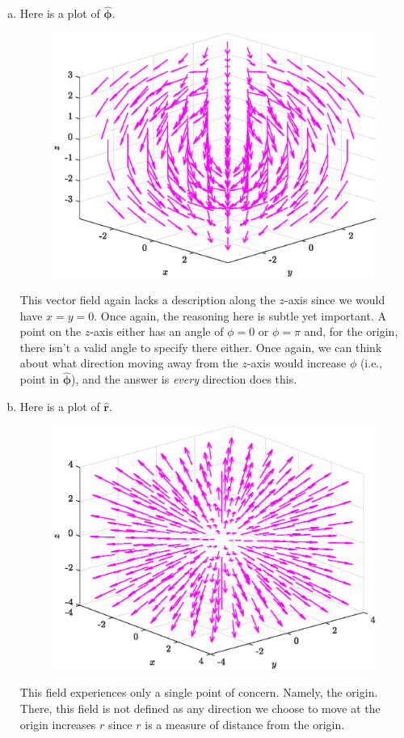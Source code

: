 \documentclass[12pt]{article} %
\newcommand{\rhat}{\boldsymbol{\hat{r}}}
\newcommand{\phihat}{\boldsymbol{\hat{\phi}}}
\begin{document}
\begin{solution}
\begin{enumerate}[(a)]
    \item Here is a plot of $\phihat$.
    \begin{figure}[H]
        \centering
        \includegraphics[width=.6\textwidth]{figures/phi_hat}
    \end{figure}
    This vector field again lacks a description along the $z$-axis since we would have $x=y=0$. Once again, the reasoning here is subtle yet important. A point on the $z$-axis either has an angle of $\phi = 0$ or $\phi = \pi$ and, for the origin, there isn't a valid angle to specify there either. Once again, we can think about what direction moving away from the $z$-axis would increase $\phi$ (i.e., point in $\phihat$), and the answer is \emph{every} direction does this. 

    \item Here is a plot of $\rhat$.
    \begin{figure}[H]
        \centering
        \includegraphics[width=.6\textwidth]{figures/r_hat}
    \end{figure}
    This field experiences only a single point of concern. Namely, the origin. There, this field is not defined as any direction we choose to move at the origin increases $r$ since $r$ is a measure of distance from the origin. 
\end{enumerate}
\end{solution}
\end{document}
